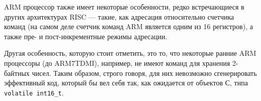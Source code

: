 ARM процессор также имеет некоторые особенности, редко встречающиеся в 
других архитектурах RISC — такие, как адресация относительно счетчика 
команд (на самом деле счетчик команд ARM является одним из 16 регистров), 
а также пре- и пост-инкрементные режимы адресации.

Другая особенность, которую стоит отметить, это то, что некоторые ранние 
ARM процессоры (до ARM7TDMI), например, не имеют команд для хранения 
2-байтных чисел. Таким образом, строго говоря, для них невозможно 
сгенерировать эффективный код, который бы вел себя так, как ожидается от 
объектов С, типа \verb|volatile int16_t|.

